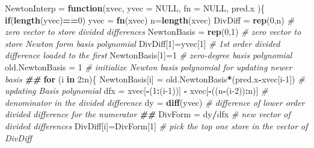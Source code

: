 \documentclass[
]{book}
\newenvironment{Shaded}{\begin{snugshade}}{\end{snugshade}}
\newcommand{\AttributeTok}[1]{\textcolor[rgb]{0.13,0.29,0.53}{#1}}
\newcommand{\CommentTok}[1]{\textcolor[rgb]{0.56,0.35,0.01}{\textit{#1}}}
\newcommand{\ConstantTok}[1]{\textcolor[rgb]{0.56,0.35,0.01}{#1}}
\newcommand{\ControlFlowTok}[1]{\textcolor[rgb]{0.13,0.29,0.53}{\textbf{#1}}}
\newcommand{\DecValTok}[1]{\textcolor[rgb]{0.00,0.00,0.81}{#1}}
\newcommand{\DocumentationTok}[1]{\textcolor[rgb]{0.56,0.35,0.01}{\textbf{\textit{#1}}}}
\newcommand{\FunctionTok}[1]{\textcolor[rgb]{0.13,0.29,0.53}{\textbf{#1}}}
\newcommand{\NormalTok}[1]{#1}
\newcommand{\OtherTok}[1]{\textcolor[rgb]{0.56,0.35,0.01}{#1}}
\newcommand{\SpecialCharTok}[1]{\textcolor[rgb]{0.81,0.36,0.00}{\textbf{#1}}}
\begin{document}
\begin{Shaded}
\begin{Highlighting}[]
\NormalTok{NewtonInterp }\OtherTok{=} \ControlFlowTok{function}\NormalTok{(xvec, }
                        \AttributeTok{yvec =} \ConstantTok{NULL}\NormalTok{, }
                        \AttributeTok{fn =} \ConstantTok{NULL}\NormalTok{,}
\NormalTok{                        pred.x}
\NormalTok{                        )\{}
 \ControlFlowTok{if}\NormalTok{(}\FunctionTok{length}\NormalTok{(yvec)}\SpecialCharTok{==}\DecValTok{0}\NormalTok{) yvec }\OtherTok{=} \FunctionTok{fn}\NormalTok{(xvec)}
\NormalTok{ n}\OtherTok{=}\FunctionTok{length}\NormalTok{(xvec)}
\NormalTok{ DivDiff }\OtherTok{=} \FunctionTok{rep}\NormalTok{(}\DecValTok{0}\NormalTok{,n)         }\CommentTok{\# zero vector to store divided differences}
\NormalTok{ NewtonBasis }\OtherTok{=} \FunctionTok{rep}\NormalTok{(}\DecValTok{0}\NormalTok{,}\DecValTok{1}\NormalTok{)     }\CommentTok{\# zero vector to store Newton form basis polynomial }
\NormalTok{ DivDiff[}\DecValTok{1}\NormalTok{]}\OtherTok{=}\NormalTok{yvec[}\DecValTok{1}\NormalTok{]         }\CommentTok{\# 1st order divided difference loaded to the first}
\NormalTok{ NewtonBasis[}\DecValTok{1}\NormalTok{]}\OtherTok{=}\DecValTok{1}           \CommentTok{\# zero{-}degree basis polynomial}
\NormalTok{ old.NewtonBasis }\OtherTok{=} \DecValTok{1}        \CommentTok{\# initialize Newton basis polynomial for updating newer basis}
 \DocumentationTok{\#\#}
 \ControlFlowTok{for}\NormalTok{ (i }\ControlFlowTok{in} \DecValTok{2}\SpecialCharTok{:}\NormalTok{n)\{}
\NormalTok{    NewtonBasis[i] }\OtherTok{=}\NormalTok{ old.NewtonBasis}\SpecialCharTok{*}\NormalTok{(pred.x}\SpecialCharTok{{-}}\NormalTok{xvec[i}\DecValTok{{-}1}\NormalTok{])  }\CommentTok{\# updating Basis polynomial   }
\NormalTok{    dfx }\OtherTok{=}\NormalTok{ xvec[}\SpecialCharTok{{-}}\NormalTok{(}\DecValTok{1}\SpecialCharTok{:}\NormalTok{(i}\DecValTok{{-}1}\NormalTok{))] }\SpecialCharTok{{-}}\NormalTok{ xvec[}\SpecialCharTok{{-}}\NormalTok{((n}\SpecialCharTok{{-}}\NormalTok{(i}\DecValTok{{-}2}\NormalTok{))}\SpecialCharTok{:}\NormalTok{n)]         }\CommentTok{\# denominator in the divided difference}
\NormalTok{    dy }\OtherTok{=} \FunctionTok{diff}\NormalTok{(yvec)              }\CommentTok{\# difference of lower order divided difference for the numerator}
    \DocumentationTok{\#\#        }
\NormalTok{    DivForm }\OtherTok{=}\NormalTok{ dy}\SpecialCharTok{/}\NormalTok{dfx                   }\CommentTok{\# new vector of divided differences}
\NormalTok{    DivDiff[i]}\OtherTok{=}\NormalTok{DivForm[}\DecValTok{1}\NormalTok{]              }\CommentTok{\# pick the top one store in the vector of DivDiff}

\end{Highlighting}
\end{Shaded}
\end{document}
